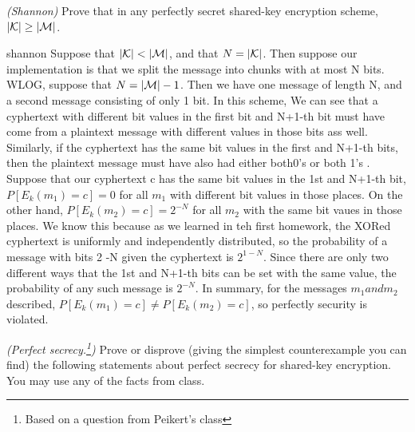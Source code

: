 \begin{questions}
\begin{parts}
\end{parts}




  \question[5]
	\emph{(Shannon)}  Prove that in any perfectly secret shared-key encryption scheme, $|\mathcal{K}| \ge |\mathcal{M}|$.

  \begin{mysolution}{shannon}
		Suppose that $|\mathcal{K}| < |\mathcal{M}|$, and that $N = |\mathcal{K}|$. Then suppose our implementation is that we split the message into chunks with at most N bits. WLOG, suppose that $N = |\mathcal{M}|-1$. Then we have one message of length N, and a second message consisting of only 1 bit. In this scheme, We can see that a cyphertext with different bit values in the first bit and N+1-th bit must have come from a plaintext message with different values in those bits ass well. Similarly, if the cyphertext has the same bit values in the first and N+1-th bits, then the plaintext message must have also had either both0's or both 1's . Suppose that our cyphertext c has the same bit values in the 1st and N+1-th bit, $P[E_k(m_1)= c] =0$ for all $m_1$ with different bit values in those places. On the other hand,  $P[E_k(m_2)= c] =2^{-N}$ for all $m_2$ with the same bit vaues in those places. We know this because as we learned in teh first homework, the XORed cyphertext is uniformly and independently distributed, so the probability of a message with bits 2 -N given the cyphertext is $2^{1-N}$. Since there are only two different ways that the 1st and N+1-th bits can be set with the same value, the probability of any such message is $2^{-N}$. In summary, for the messages $m_1 and m_2$ described, $P[E_k(m_1)= c] \neq P[E_k(m_2)= c]$, so perfectly security is violated. 
  \end{mysolution}


  \question
	\emph{(Perfect secrecy.\footnote{Based on a question from Peikert's class\label{fn:peikert}})}  Prove or disprove (giving the
  simplest counterexample you can find) the following statements about
  perfect secrecy for shared-key encryption.  You may use any of the
  facts from class.


\end{questions}
